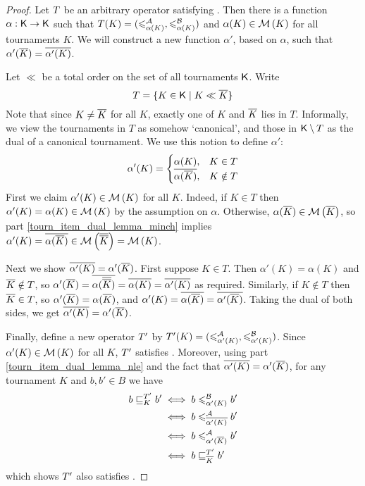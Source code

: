 \begin{proof}
    Let $T$ be an arbitrary operator satisfying \chainmin{}. Then
    there is a function $\alpha: \mathsf{K} \to \mathsf{K}$ such that $T(K) =
    ({\leqslant^{\mathcal{A}}_{\alpha(K)}}, {\leqslant^{\mathcal{B}}_{\alpha(K)}})$ and $\alpha(K) \in \operatorname{\mathcal{M}}\left({K}\right)$
    for all tournaments $K$. We will construct a new function $\alpha'$, based
    on $\alpha$, such that $\alpha'({\overline{K}}) = {\overline{\alpha'(K)}}$.

    Let $\ll$ be a total order on the set of all tournaments
    $\mathsf{K}$.\footnotemark{} Write
    \[
        T = \{K \in \mathsf{K} \mid K \ll {\overline{K}}\}
    \]
    Note that since $K \ne {\overline{K}}$ for all $K$, exactly one of $K$ and
    ${\overline{K}}$ lies in $T$. Informally, we view the tournaments in $T$ as
    somehow `canonical', and those in $\mathsf{K} \setminus T$ as the dual of a
    canonical tournament. We use this notion to define $\alpha'$:
    \[
        \alpha'(K) = \begin{cases}
            \alpha(K),& K \in T \\
            {\overline{\alpha({\overline{K}})}},& K \notin T
        \end{cases}
    \]
    First we claim $\alpha'(K) \in \operatorname{\mathcal{M}}\left({K}\right)$ for all $K$. Indeed, if $K \in T$
    then $\alpha'(K) = \alpha(K) \in \operatorname{\mathcal{M}}\left({K}\right)$ by the assumption on $\alpha$.
    Otherwise, $\alpha({\overline{K}}) \in \operatorname{\mathcal{M}}\left({{\overline{K}}}\right)$, so
     part \cref{tourn_item_dual_lemma_minch}
    implies $\alpha'(K) = {\overline{\alpha({\overline{K}})}} \in \operatorname{\mathcal{M}}\left({{\overline{{\overline{K}}}}}\right) =
    \operatorname{\mathcal{M}}\left({K}\right)$.

    Next we show ${\overline{\alpha'(K)}} = \alpha'({\overline{K}})$. First suppose $K \in
    T$. Then $\alpha'(K) = \alpha(K)$ and ${\overline{K}} \notin T$, so
    $\alpha'({\overline{K}}) = {\overline{\alpha({\overline{{\overline{K}}}})}} = {\overline{\alpha(K)}} =
    {\overline{\alpha'(K)}}$ as required. Similarly, if $K \notin T$ then ${\overline{K}}
    \in T$, so $\alpha'({\overline{K}}) = \alpha({\overline{K}})$, and $\alpha'(K) =
    {\overline{\alpha({\overline{K}})}} = {\overline{\alpha'({\overline{K}})}}$. Taking the dual of
    both sides, we get ${\overline{\alpha'(K)}} = \alpha'({\overline{K}})$.

    Finally, define a new operator $T'$ by $T'(K) =
    ({\leqslant^{\mathcal{A}}_{\alpha'(K)}}, {\leqslant^{\mathcal{B}}_{\alpha'(K)}})$. Since $\alpha'(K) \in
    \operatorname{\mathcal{M}}\left({K}\right)$ for all $K$, $T'$ satisfies \chainmin{}. Moreover,
    using  part
    \cref{tourn_item_dual_lemma_nle} and the fact that ${\overline{\alpha'(K)}} =
    \alpha'({\overline{K}})$, for any tournament $K$ and $b, b' \in B$ we have
    \begin{align*}
        b \sqsubseteq_K^{T'} b'
        &\iff b \leqslant^{\mathcal{B}}_{\alpha'(K)} b' \\
        &\iff b \leqslant^{\mathcal{A}}_{{\overline{\alpha'(K)}}} b' \\
        &\iff b \leqslant^{\mathcal{A}}_{\alpha'({\overline{K}})} b' \\
        &\iff b \sqsubseteq_{{\overline{K}}}^{T'} b'
    \end{align*}
    which shows $T'$ also satisfies \dualaxiom{}.
\end{proof}


